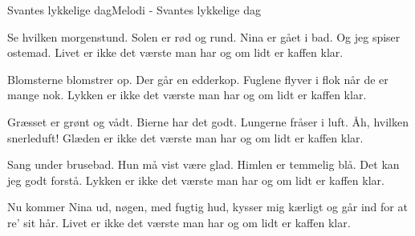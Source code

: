 \begin{sang}{Svantes lykkelige dag}{Melodi - Svantes lykkelige dag}
\begin{vers}
Se hvilken morgenstund. 
Solen er rød og rund.
Nina er gået i bad. 
Og jeg spiser ostemad.
Livet er ikke det værste man har
og om lidt er kaffen klar.
\end{vers}
\begin{vers}
Blomsterne blomstrer op.
Der går en edderkop.
Fuglene flyver i flok 
når de er mange nok.
Lykken er ikke det værste man har
og om lidt er kaffen klar.
\end{vers}
\begin{vers}
Græsset er grønt og vådt.
Bierne har det godt.    
Lungerne fråser i luft. 
Åh, hvilken snerleduft! 
Glæden  er ikke det værste man har
og om lidt er kaffen klar.
\end{vers}
\begin{vers}
Sang under brusebad.
Hun må vist være glad.
Himlen er temmelig blå.
Det kan jeg godt forstå.
Lykken er ikke det værste man har
og om lidt er kaffen klar.
\end{vers}
\begin{vers}
Nu kommer Nina ud,
nøgen, med fugtig hud,
kysser mig kærligt og går
ind for at re' sit hår. 
Livet  er ikke det værste man har
og om lidt er kaffen klar.
\end{vers}
\vbox{}\vfill
\vbox{}\vfill
\vbox{}\vfill
\vbox{}\vfill
\laps
\end{sang}